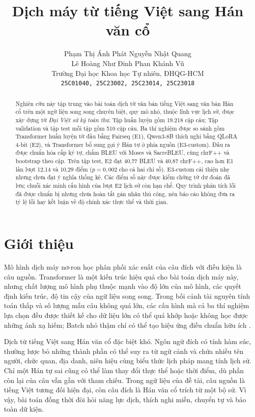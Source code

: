 \documentclass[11pt,twocolumn]{article}
\title{Dịch máy từ tiếng Việt sang Hán văn cổ}
\author{
Phạm Thị Ánh Phát \quad Nguyễn Nhật Quang\\
Lê Hoàng Như \quad Đinh Phan Khánh Vũ\\
Trường Đại học Khoa học Tự nhiên, ĐHQG-HCM\\
\texttt{25C01040, 25C23002, 25C23014, 25C23018}
}
\date{}
\begin{document}
\maketitle

\begin{abstract}

Nghiên cứu này tập trung vào bài toán dịch từ văn bản tiếng Việt sang văn bản Hán cổ trên một ngữ liệu song song chuyên biệt, quy mô nhỏ, thuộc lĩnh vực lịch sử, được xây dựng từ \textit{Đại Việt sử ký toàn thư}. Tập huấn luyện gồm 19.218 cặp câu; Tập validation và tập test mỗi tập gồm 510 cặp câu.
Ba thí nghiệm được so sánh gồm Transformer huấn luyện từ đầu bằng Fairseq (E1),
Qwen3-8B thích nghi bằng QLoRA 4-bit (E2), và Transformer bổ sung gợi ý Hán tự
ở phía nguồn (E3-custom). Đầu ra được chuẩn hóa cấp ký tự, chấm BLEU với
Moses và SacreBLEU, cùng chrF++ và bootstrap theo cặp. Trên tập test, E2 đạt
40,77 BLEU và 40,87 chrF++, cao hơn E1 lần lượt 12,14 và 10,29 điểm
($p=0{,}002$ cho cả hai chỉ số). E3-custom cải thiện nhẹ nhưng chưa đạt
ý nghĩa thống kê. Các điểm số này được kiểm chứng từ dự đoán đã lưu;
chuỗi xác minh cấu hình của lượt E2 lịch sử còn hạn chế. Quy trình phân tích
lỗi đã được chuẩn bị nhưng chưa hoàn tất gán nhãn thủ công, nên báo cáo
không đưa ra tỷ lệ lỗi hay kết luận về độ chính xác thực thể và thời gian.

\end{abstract}

\section{Giới thiệu}

Mô hình dịch máy nơ-ron học phân phối xác suất của câu đích với điều kiện là câu nguồn. Transformer \citep{vaswani2017attention} là một kiến trúc hiệu quả cho bài toán dịch máy này, nhưng chất lượng mô hình phụ thuộc mạnh vào độ lớn của mô hình, các quyết định kiến trúc, độ tin
cậy của ngữ liệu song song. Trong bối cảnh tài nguyên tính toán thấp và số lượng mẫu câu không quá lớn, các cấu hình mà cả ba thí nghiệm lựa chọn đều được thiết kế cho dữ liệu lớn có thể quá khớp hoặc không học được những ánh xạ hiếm; Batch nhỏ thậm chí có thể tạo hiệu ứng điều chuẩn hữu ích \citep{atrio2021small}.

Dịch từ tiếng Việt sang Hán văn cổ đặc biệt khó. Ngôn ngữ đích có tính hàm súc, thường lược bỏ những thành phần có thể suy ra từ ngữ cảnh và chứa nhiều tên người, chức quan, địa danh, niên hiệu cùng biểu thức lịch pháp mang tính lịch sử. Chỉ một Hán tự sai cũng có thể làm thay đổi thực thể hoặc thời điểm, dù phần còn lại của câu vẫn gần với tham chiếu. Trong ngữ liệu của đề tài, câu nguồn là tiếng Việt tương đối hiện đại, còn câu đích là Hán văn cổ trích từ một bộ sử. Vì vậy, bài toán đồng thời đòi hỏi năng lực dịch, thích nghi miền, chuyển tự và bảo toàn dữ kiện.
\end{document}

